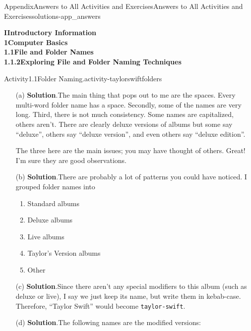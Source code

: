 \documentclass[oneside,10pt,]{book}
\newcommand{\blocktitlefont}{\relax}
\newcommand{\mono}[1]{\texttt{#1}}
\begin{document}
\begin{solutions-chapter}{Appendix}{Answers to All Activities and Exercises}{}{Answers to All Activities and Exercises}{}{}{solutions-app_answers}
\par\medskip
\noindent\textbf{\Large{}I\space\textperiodcentered\space{}Introductory Information\\
1\space\textperiodcentered\space{}Computer Basics\\
1.1\space\textperiodcentered\space{}File and Folder Names\\
1.1.2\space\textperiodcentered\space{}Exploring File and Folder Naming Techniques}
\begin{activitysolution}{Activity}{1.1}{Folder Naming.}{activity-taylorswiftfolders}%
\begin{enumerate}[font=\bfseries,label=(\alph*),ref=\alph*]%
\item[(a)]\noindent\textbf{\blocktitlefont Solution}.\hypertarget{solution-taylorswiftfolders-d-b-back}{}\quad{}The main thing that pops out to me are the spaces. Every multi-word folder name has a space. Secondly, some of the names are very long. Third, there is not much consistency. Some names are capitalized, others aren't. There are clearly deluxe versions of albums but some say ``deluxe'', others say ``deluxe version'', and even others say ``deluxe edition''.%
\par
The three here are the main issues; you may have thought of others. Great! I'm sure they are good observations.%
\item[(b)]\noindent\textbf{\blocktitlefont Solution}.\hypertarget{solution-taylorswiftgroups-b-back}{}\quad{}There are probably a lot of patterns you could have noticed. I grouped folder names into%
\begin{enumerate}[label=\arabic*]
\item{}Standard albums%
\item{}Deluxe albums%
\item{}Live albums%
\item{}Taylor's Version albums%
\item{}Other%
\end{enumerate}
%
\item[(c)]\noindent\textbf{\blocktitlefont Solution}.\hypertarget{solution-taylorswiftfolders-f-b-back}{}\quad{}Since there aren't any special modifiers to this album (such as deluxe or live), I say we just keep its name, but write them in kebab-case. Therefore, ``Taylor Swift'' would become \mono{taylor-swift}.%
\item[(d)]\noindent\textbf{\blocktitlefont Solution}.\hypertarget{solution-taylorswiftfolders-g-b-back}{}\quad{}The following names are the modified versions:%

\end{enumerate}
\end{activitysolution}
\end{solutions-chapter}
\end{document}
